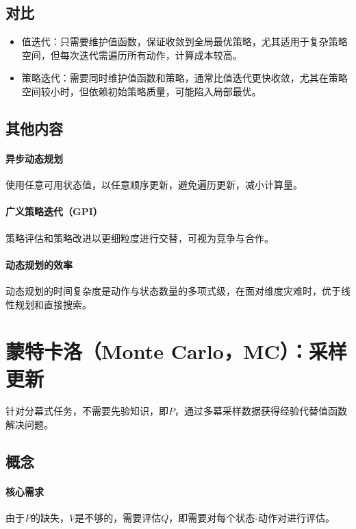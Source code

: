 \documentclass[
12pt, %
a4paper, 
oneside, %
headinclude,footinclude, %
]{scrartcl}
\begin{document}
\subsection[对比]{对比}
\begin{itemize}
\item 值迭代：只需要维护值函数，保证收敛到全局最优策略，尤其适用于复杂策略空间，但每次迭代需遍历所有动作，计算成本较高。
\item 策略迭代：需要同时维护值函数和策略，通常比值迭代更快收敛，尤其在策略空间较小时，但依赖初始策略质量，可能陷入局部最优。
\end{itemize}
\subsection[其他内容]{其他内容}
\paragraph{异步动态规划}
使用任意可用状态值，以任意顺序更新，避免遍历更新，减小计算量。
\paragraph{广义策略迭代（GPI）}
策略评估和策略改进以更细粒度进行交替，可视为竞争与合作。
\paragraph{动态规划的效率}
动态规划的时间复杂度是动作与状态数量的多项式级，在面对维度灾难时，优于线性规划和直接搜索。
\section[蒙特卡洛]{蒙特卡洛（Monte Carlo，MC）：采样更新}
针对分幕式任务，不需要先验知识，即$ P $，通过多幕采样数据获得经验代替值函数解决问题。
\subsection[概念]{概念}
\paragraph{核心需求}
由于$ P $的缺失，$ V $是不够的，需要评估$ Q $，即需要对每个状态-动作对进行评估。
\end{document}
